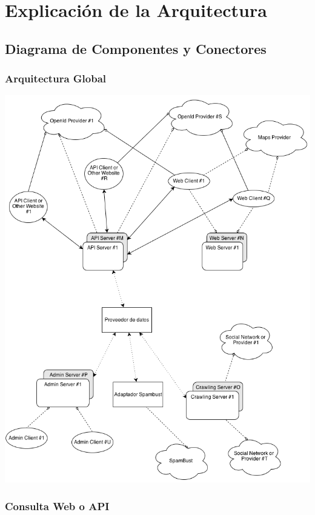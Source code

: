 \section*{Explicaci\'on de la Arquitectura}

\subsection*{Diagrama de Componentes y Conectores}

\subsubsection*{Arquitectura Global}

\includegraphics[scale=0.5]{ISW2_cNc_Global}


\subsubsection*{Consulta Web o API}

